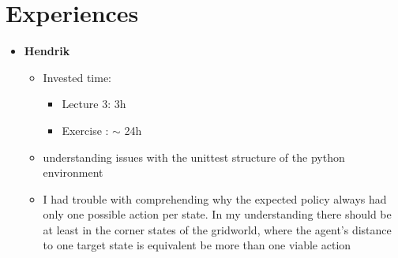 \documentclass[paper=a4, fontsize=10pt]{scrartcl} %
\numberwithin{equation}{section} %
\numberwithin{figure}{section} %
\numberwithin{table}{section} %
\begin{document}
\section{Experiences}
\begin{itemize}
	\item \textbf{Hendrik}
	\begin{itemize}
		\item Invested time:
		\begin{itemize}
			\item Lecture 3: 3h
			\item Exercise : $\sim$ 24h
		\end{itemize}
		\item understanding issues with the unittest structure of the python environment
		\item I had trouble with comprehending why the expected policy always had only one possible action per state. In my understanding there should be at least in the corner states of the gridworld, where the agent's distance to one target state is equivalent be more than one viable action
	\end{itemize}
\end{itemize}
	
\end{document}
